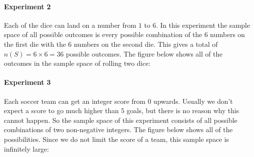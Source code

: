 \paragraph{Experiment 2} Each of the dice can land on a number from $1$
to $6$. In this experiment the sample space of all possible outcomes is
every possible combination of the $6$ numbers on the first die with the
$6$ numbers on the second die. This gives a total of \(n(S) = 6 \times 6
= 36\) possible outcomes. The figure below shows all of the outcomes
in the sample space of rolling two dice:

\begin{figure}[H]
\begin{center}
\end{center}
\end{figure} 

\paragraph{Experiment 3} Each soccer team can get an integer score
from $0$ upwards. Usually we don't expect a score to go much higher than
$5$ goals, but there is no reason why this cannot happen. So the sample
space of this experiment consists of all possible combinations of two
non-negative integers. The figure below shows all of the
possibilities. Since we do not limit the score of a team, this sample
space is infinitely large:

\begin{figure}[H]
\begin{center}
\end{center}
\end{figure}


